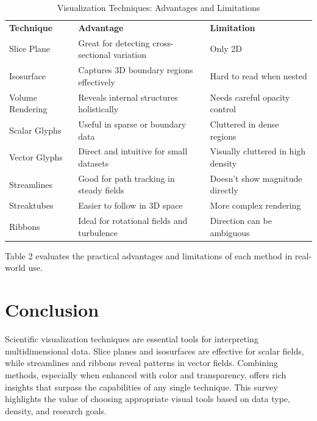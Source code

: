 \documentclass[11pt]{article}
\begin{document}
	\begin{table}[H]
		\centering
		\caption{Visualization Techniques: Advantages and Limitations}
		\renewcommand{\arraystretch}{1.3}
		\begin{tabular}{|l|l|l|}
			\hline
			\textbf{Technique} & \textbf{Advantage} & \textbf{Limitation} \\

			Slice Plane        & Great for detecting cross-sectional variation & Only 2D \\

			Isosurface         & Captures 3D boundary regions effectively      & Hard to read when nested \\

			Volume Rendering   & Reveals internal structures holistically     & Needs careful opacity control \\

			Scalar Glyphs      & Useful in sparse or boundary data            & Cluttered in dense regions \\

			Vector Glyphs      & Direct and intuitive for small datasets      & Visually cluttered in high density \\

			Streamlines        & Good for path tracking in steady fields      & Doesn't show magnitude directly \\

			Streaktubes        & Easier to follow in 3D space                 & More complex rendering \\

			Ribbons            & Ideal for rotational fields and turbulence   & Direction can be ambiguous \\
			\hline
		\end{tabular}
	\end{table}
	
	\noindent Table 2 evaluates the practical advantages and limitations of each method in real-world use.
	
	\section{Conclusion}
	Scientific visualization techniques are essential tools for interpreting multidimensional data. Slice planes and isosurfaces are effective for scalar fields, while streamlines and ribbons reveal patterns in vector fields. Combining methods, especially when enhanced with color and transparency, offers rich insights that surpass the capabilities of any single technique. This survey highlights the value of choosing appropriate visual tools based on data type, density, and research goals.
	
\end{document}

